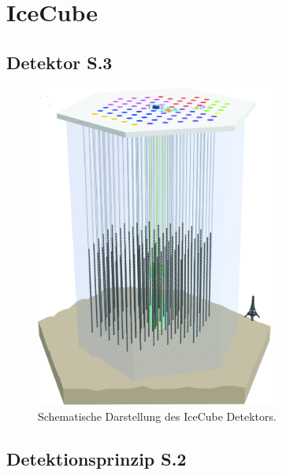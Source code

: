 \thispagestyle{plain}
\chapter{IceCube}

\section{Detektor S.3}
\begin{figure}[!h]
    \centering
    \includegraphics[width=0.7\textwidth]{./Plots/IceCube_NoLabels_cropped.jpg}
    \caption{Schematische Darstellung des IceCube Detektors.}
    \label{fig:IceCube}
\end{figure}
\section{Detektionsprinzip S.2}
